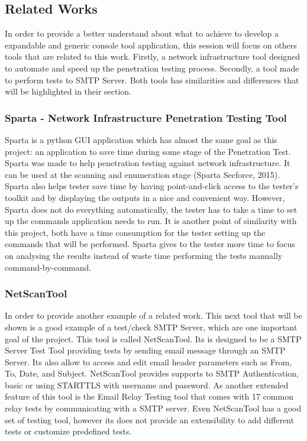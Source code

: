 \documentclass[a4paper, 12pt]{article}
\begin{document}
\subsection{Related Works}

In order to provide a better understand about what to achieve to develop a expandable and generic console tool application, this session will focus on others tools that are related to this work. Firstly, a network infrastructure tool designed to automate and speed up the penetration testing process. Secondly, a tool made to perform tests to SMTP Server. Both tools has similarities and differences that will be highlighted in their section.


\subsubsection{Sparta - Network Infrastructure Penetration Testing Tool}

Sparta is a python GUI application which has almost the same goal as this project: an application to save time during some stage of the Penetration Test. Sparta was made to help penetration testing against network infrastructure. It can be used at the scanning and enumeration stage (Sparta Secforce, 2015). Sparta also helps tester save time by having point-and-click access to the tester's toolkit and by displaying the outputs in a nice and convenient way. However, Sparta does not do everything automatically, the tester has to take a time to set up the commands application needs to run. It is another point of similarity with this project, both  have a time consumption for the tester setting up the commands that will be performed. Sparta gives to the tester more time to focus on analysing the results instead of waste time performing the tests manually command-by-command. 

\subsubsection{NetScanTool}

In order to provide another example of a related work. This next tool that will be shown is a good example of a test/check SMTP Server, which are one important goal of the project. This tool is called NetScanTool. Its is designed  to be a SMTP Server Test Tool providing tests by sending email message through an SMTP Server. Its also allow to access and edit email header parameters such as From, To, Date, and Subject. NetScanTool provides supports to SMTP Authentication, basic or using STARTTLS with username and password. As another extended feature of this tool is the Email Relay Testing tool that comes with 17 common relay tests by communicating with a SMTP server. Even NetScanTool has a good set of testing tool, however its does not provide an extensibility to add different tests or customize predefined tests.
\end{document}
